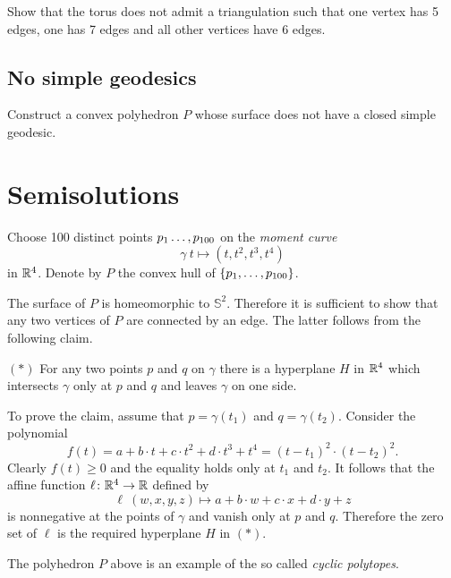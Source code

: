 \begin{pr}
Show that the torus does not admit a triangulation 
such that one vertex has 5 edges,
one has 7 edges and 
all other vertices have 
6 edges. 
\end{pr}


\subsection*{No simple geodesics\easy}\label{No simple geodesics}

\begin{pr}
Construct a convex polyhedron $P$ whose surface 
does not have a closed simple geodesic.
\end{pr}

\section*{Semisolutions}


Choose 100 distinct points $p_1\z\dots,p_{100}$
on the {}\emph{moment curve} 
\[\gamma\:t\mapsto (t,t^2,t^3,t^4)\] 
in $\mathbb{R}^4$.
Denote by $P$ the convex hull of $\{p_1,\z\dots,p_{100}\}$.

The surface of $P$ is homeomorphic to $\mathbb{S}^2$.
Therefore it is sufficient to show that any two vertices of $P$ are connected by an edge.
The latter follows from the following claim.

\begin{cl}{$({*})$}
For any two points $p$ and $q$ on $\gamma$ there is a hyperplane $H$ in $\mathbb{R}^4$ which intersects $\gamma$ only at $p$ and $q$ and leaves $\gamma$ on one side.
\end{cl}

To prove the claim, assume that $p=\gamma(t_1)$ and $q=\gamma(t_2)$. 
Consider the polynomial
\[f(t)=a+b\cdot t+c\cdot t^2+d\cdot t^3+t^4=(t-t_1)^2\cdot(t-t_2)^2.\]
Clearly $f(t)\ge 0$ and the equality holds only at $t_1$ and $t_2$.
It follows that the affine function $\ell\colon\mathbb{R}^4\to\mathbb{R}$ defined by 
\[\ell\:(w,x,y,z)\mapsto a+b\cdot w+c\cdot x+d\cdot y+z\]
is nonnegative at the points of $\gamma$ and vanish only at $p$ and $q$.
Therefore the zero set of $\ell$ is the required hyperplane $H$ in $({*})$. 
\qeds

The polyhedron $P$ above is an example of the so called \emph{cyclic polytopes}.

